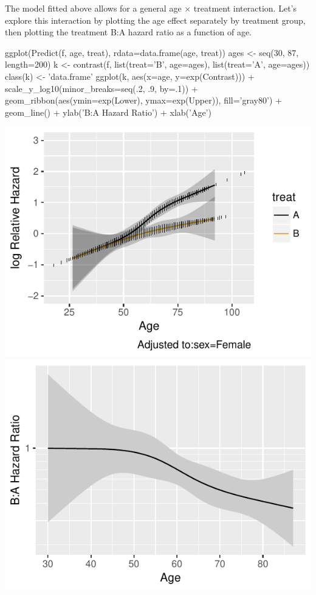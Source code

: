 The model fitted above allows for a general age $\times$ treatment interaction.  Let's explore this interaction by plotting the age effect separately by treatment group, then plotting the treatment B:A hazard ratio as a function of age.
\begin{Schunk}
\begin{Sinput}
ggplot(Predict(f, age, treat), rdata=data.frame(age, treat))
ages <- seq(30, 87, length=200)
k <- contrast(f, list(treat='B', age=ages), list(treat='A', age=ages))
class(k) <- 'data.frame'
ggplot(k, aes(x=age, y=exp(Contrast))) + scale_y_log10(minor_breaks=seq(.2, .9, by=.1)) + 
  geom_ribbon(aes(ymin=exp(Lower), ymax=exp(Upper)), fill='gray80') +
  geom_line() +
  ylab('B:A Hazard Ratio') + xlab('Age')
\end{Sinput}


\centerline{\includegraphics{ancova-hteplot-1} \includegraphics{ancova-hteplot-2} }

\end{Schunk}

